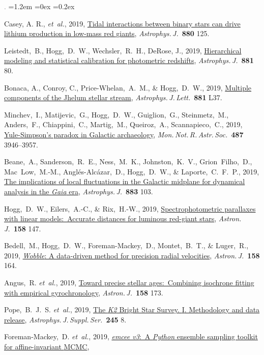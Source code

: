 \documentclass[10pt,letterpaper]{article}
\newcommand{\acronym}[1]{{\small{#1}}}
\newcommand{\foreign}[1]{\textsl{#1}}
\newcommand{\etal}{\foreign{et~al.}}
\newcommand{\project}[1]{\textsl{#1}}
\newcommand{\doi}[2]{\href{http://dx.doi.org/#1}{{#2}}}
\newcommand{\deemph}[1]{\textcolor{grey}{\footnotesize{#1}}}
\newcommand{\pubnumber}[1]{\deemph{{#1}.}}
\newcounter{refpubnum}
\newcommand{\hogglist}{%
    \rightmargin=0in
    \leftmargin=1.2em
    \topsep=0ex
    \partopsep=0pt
    \itemsep=0.2ex
    \parsep=0pt
    \itemindent=-1.0\leftmargin
    \listparindent=0.0\leftmargin
    \settowidth{\labelsep}{~}
    \usecounter{refpubnum}
  }
\begin{document}
\begin{list}{\pubnumber{\therefpubnum}}{\hogglist}
\item
Casey, A. R., \etal, 2019,
\doi{10.3847/1538-4357/ab27bf}{Tidal interactions between binary stars can drive lithium production in low-mass red giants},
\textit{Astrophys.\,J.}\ \textbf{880} 125.
\item
Leistedt,~B., Hogg,~D.~W., Wechsler,~R.~H., DeRose, J., 2019,
\doi{10.3847/1538-4357/ab2d29}{Hierarchical modeling and statistical calibration for photometric redshifts},
\textit{Astrophys.\,J.}\ \textbf{881} 80.
\item
Bonaca, A., Conroy, C., Price-Whelan,~A.~M., \& Hogg,~D.~W., 2019,
\doi{10.3847/2041-8213/ab36ba}{Multiple components of the Jhelum stellar stream},
\textit{Astrophys.\,J.\,Lett.}\ \textbf{881} L37.
\item
Minchev,~I., Matijevic,~G., Hogg,~D.~W., Guiglion,~G., Steinmetz,~M.,
Anders,~F., Chiappini,~C., Martig,~M., Queiroz,~A., Scannapieco,~C., 2019,
\doi{10.1093/mnras/stz1239}{Yule-Simpson's paradox in Galactic archaeology},
\textit{Mon.\,Not.\,R.\,Astr.\,Soc.}\ \textbf{487} 3946--3957.
\item
Beane,~A., Sanderson,~R.~E., Ness,~M.~K., Johnston,~K.~V., Grion~Filho,~D.,
Mac~Low,~M.-M., Angl\'es-Alc\'azar,~D., Hogg,~D.~W., \& Laporte,~C.~F.~P., 2019,
\doi{10.3847/1538-4357/ab3d3c}{The implications of local fluctuations
in the Galactic midplane for dynamical analysis in the \project{Gaia} era},
\textit{Astrophys.\,J.}\ \textbf{883} 103.
\item
Hogg,~D.~W., Eilers,~A.-C., \& Rix,~H.-W., 2019,
\doi{10.3847/1538-3881/ab398c}{Spectrophotometric parallaxes with
linear models:\ Accurate distances for luminous red-giant stars},
\textit{Astron.\,J.}\ \textbf{158} 147.
\item
Bedell,~M., Hogg,~D.~W., Foreman-Mackey,~D., Montet,~B.~T., \& Luger,~R., 2019,
\doi{10.3847/1538-3881/ab40a7}{\project{Wobble}: A data-driven method for precision radial velocities},
\textit{Astron.\,J.}\ \textbf{158} 164.
\item
Angus,~R. \etal, 2019,
\doi{10.3847/1538-3881/ab3c53}{Toward precise stellar ages:\ Combining isochrone fitting with empirical gyrochronology},
\textit{Astron.\,J.}\ \textbf{158} 173.
\item
Pope,~B.~J.~S. \etal, 2019,
\doi{10.3847/1538-4365/ab3d29}{The \project{\acronym{K2}} Bright Star Survey. \acronym{I}. Methodology and data release},
\textit{Astrophys.\,J.\,Suppl.\,Ser.}\ \textbf{245} 8.
\item
Foreman-Mackey,~D. \etal, 2019,
\doi{10.21105/joss.01864}{\project{emcee v3}:\ A \project{Python} ensemble sampling toolkit for affine-invariant \acronym{MCMC}},

\end{list}
\end{document}
